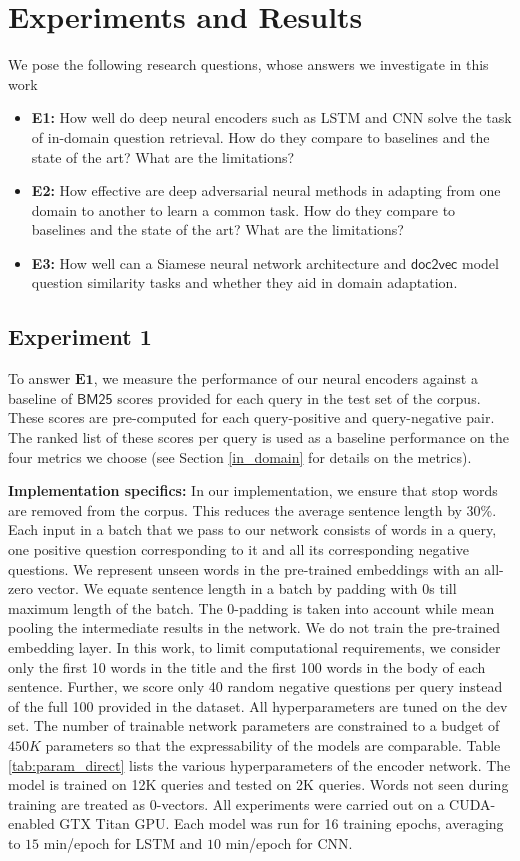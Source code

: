 \documentclass{sigkddExp}
\begin{document}
\section{Experiments and Results}
\label{experiments}
We pose the following research questions, whose answers we investigate in this work
\begin{itemize}[topsep=0pt,itemsep=-1ex,partopsep=1ex,parsep=1ex]
\item \textbf{E1:} How well do deep neural encoders such as LSTM and CNN solve the task of in-domain question retrieval. How do they compare to baselines and the state of the art? What are the limitations?
\item \textbf{E2:} How effective are deep adversarial neural methods in adapting from one domain to another to learn a common task. How do they compare to baselines and the state of the art? What are the limitations?
\item \textbf{E3:} How well can a Siamese neural network architecture and $\mathsf{doc2vec}$ model question similarity tasks and whether they aid in domain adaptation.
\end{itemize}

\subsection{Experiment 1}
To answer $\mathbf{E1}$, we measure the performance of our neural encoders against a baseline of $\mathsf{BM25}$ scores provided for each query in the test set of the corpus. These scores are pre-computed for each query-positive and query-negative pair. The ranked list of these scores per query is used as a baseline performance on the four metrics we choose (see Section \ref{in_domain} for details on the metrics).

\textbf{Implementation specifics:}
In our implementation, we ensure that stop words are removed from the corpus. This reduces the average sentence length by 30\%. Each input in a batch that we pass to our network consists of words in a query, one positive question corresponding to it and all its corresponding negative questions.  We represent unseen words in the pre-trained embeddings with an all-zero vector. We equate sentence length in a batch by padding with $0$s till maximum length of the batch. The 0-padding is taken into account while mean pooling the intermediate results in the network. We do not train the pre-trained embedding layer. In this work, to limit computational requirements, we consider only the first 10 words in the title and the first 100 words in the body of each sentence. Further, we score only 40 random negative questions per query instead of the full 100 provided in the dataset. All hyperparameters are tuned on the dev set. The number of trainable network parameters are constrained to a budget of $450K$ parameters so that the expressability of the models are comparable. Table \ref{tab:param_direct} lists the various hyperparameters of the encoder network. The model is trained on 12K queries and tested on 2K queries. Words not seen during training are treated as 0-vectors. All experiments were carried out on a CUDA-enabled GTX Titan GPU. Each model was run for 16 training epochs, averaging to $15$ min/epoch for LSTM and $10$ min/epoch for CNN.
\end{document}
